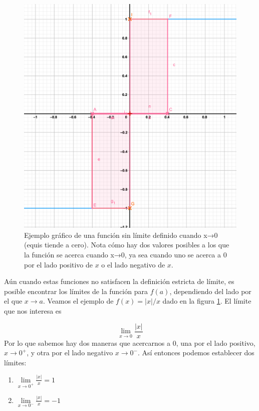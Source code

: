 \documentclass[
]{book}
\providecommand{\tightlist}{%
  \setlength{\itemsep}{0pt}\setlength{\parskip}{0pt}}
\begin{document}
\begin{figure}

{\centering \includegraphics[width=19.21in]{Unidad-III/Limite-abs-x} 

}

\caption{Ejemplo gráfico de una función sin límite definido cuando x→0 (equis tiende a cero). Nota cómo hay dos valores posibles a los que la función se acerca cuando x→0, ya sea cuando uno se acerca a 0 por el lado positivo de $x$ o el lado negativo de $x$.}\label{fig:limite-indef}
\end{figure}

Aún cuando estas funciones no satisfacen la definición estricta de límite, es posible encontrar los límites de la función para \(f(a)\), dependiendo del lado por el que \(x \rightarrow a\). Veamos el ejemplo de \(f(x) = |x|/x\) dado en la figura \ref{fig:limite-indef}. El límite que nos interesa es

\[ \lim \limits_{x \rightarrow 0} \frac{|x|}{x}\]
Por lo que sabemos hay dos maneras que acercarnos a \(0\), una por el lado positivo, \(x \rightarrow 0^{+}\), y otra por el lado negativo \(x \rightarrow 0^-\). Así entonces podemos establecer dos límites:

\begin{enumerate}
\def\labelenumi{\arabic{enumi}.}
\tightlist
\item
  \(\lim \limits_{x \rightarrow 0^+} \frac{|x|}{x} = 1\)
\item
  \(\lim \limits_{x \rightarrow 0^-} \frac{|x|}{x} = -1\)
\end{enumerate}
\end{document}
